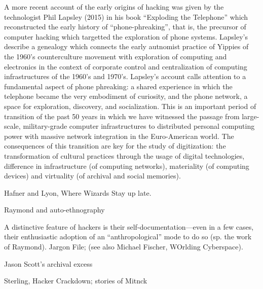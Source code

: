 \documentclass[10pt,letter,oneside]{scrartcl}
\begin{document}
A more recent account of the early origins of hacking was given by the technologist Phil Lapsley (2015) in his book ``Exploding the Telephone'' which reconstructed the early history of ``phone-phreaking'', that is, the precursor of computer hacking which targetted the exploration of phone systems. Lapsley's describe a genealogy which connects the early autnomist practice of Yippies of the 1960's counterculture movement with exploration of computing and electronics in the context of corporate control and centralization of computing infrastructures of the 1960's and 1970's.  Lapsley's account calls attention to a fundamental aspect of phone phreaking: a shared experience in which the telephone became the very embodiment of curiosity, and the phone network, a space for exploration, discovery, and socialization.  This is an important period of transition of the past 50 years in which we have witnessed the passage from large-scale, military-grade computer infrastructures to distributed personal computing power with massive network integration in the Euro-American world. The consequences of this transition are key for the study of digitization: the transformation of cultural practices through the usage of digital technologies, difference in infrastructure (of computing networks), materiality (of computing devices) and virtuality (of archival and social memories).

Hafner and Lyon, Where Wizards Stay up late. 

Raymond and auto-ethnography

A distinctive feature of hackers is their self-documentation---even in a few cases, their enthusiastic adoption of an ``anthropological'' mode to do so (sp. the work of Raymond).  Jargon File; (see also Michael Fischer, WOrlding Cyberspace).

Jason Scott's archival excess

Sterling, Hacker Crackdown; stories of Mitnck
\end{document}
